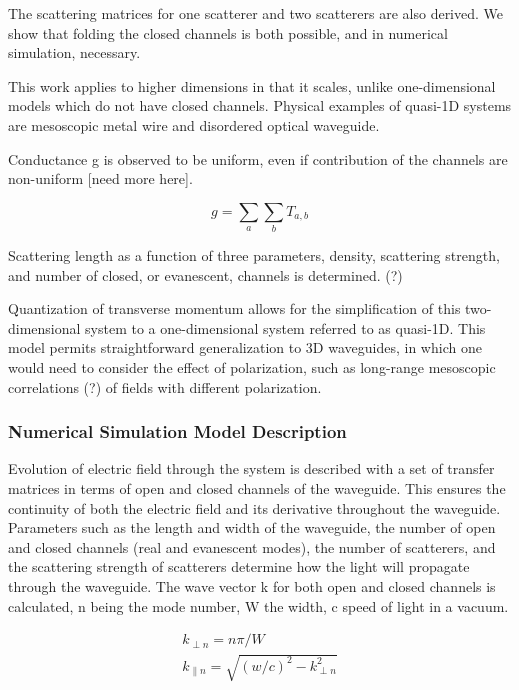 The scattering matrices for one scatterer and two scatterers are also
derived. We show that folding the closed channels is both possible, and in numerical 
simulation, necessary.  

This work applies to higher dimensions in that it scales, unlike one-dimensional
models which do not have closed channels. Physical examples of quasi-1D systems 
are mesoscopic metal wire and disordered optical waveguide.

Conductance g is observed to be uniform, even if contribution of the channels
are non-uniform [need more here]. 

\begin{equation}
g = \sum_a \sum_b T_{a,b}
\end{equation}

Scattering length as a function of three parameters, density, scattering strength, and number of closed, or 
evanescent, channels is determined. (?)

Quantization of transverse momentum allows for the simplification of 
this two-dimensional system to a one-dimensional system referred to as 
quasi-1D. This model permits straightforward generalization to 3D waveguides, 
in which one would need to consider the effect of polarization, such as long-range mesoscopic 
correlations (?) of fields with different polarization.

\subsubsection {Numerical Simulation Model Description}

Evolution of electric field through the system is 
described with a set of transfer matrices in terms of open and closed channels
of the waveguide.  This ensures the continuity of both the electric field 
and its derivative throughout the waveguide.  Parameters such as the length
and width of the waveguide, the number of open and closed channels (real 
and evanescent modes), the number of scatterers, and the scattering strength
of scatterers determine how the light will propagate through the 
waveguide. The wave vector k for both open and closed channels is calculated,
n being the mode number, W the width, c speed of light in a vacuum.

\begin{equation}
\begin{gathered}
k_{\perp n}=n\pi /W \\
k_{\parallel n}=\sqrt{(w/c)^2-k_{\perp n}^2}
\end{gathered}
\label{kwaveguide}
\end{equation}

